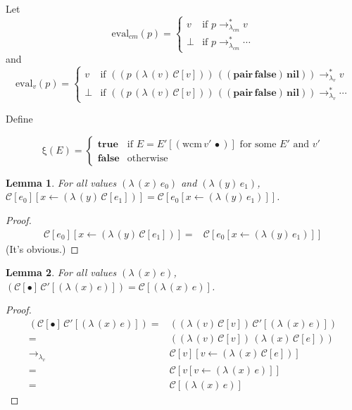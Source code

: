 \documentclass[ms,electronic,twosidetoc,letterpaper,chaptercenter,parttop]{byumsphd}
\newcommand{\false}{\mathbf{false}}
\newcommand{\nil}{\mathbf{nil}}
\newcommand{\pair}[2]{((\mathbf{pair}\,#1)\,#2)}
\newcommand{\lvrr}{\rightarrow_{\lambda_v}}
\newcommand{\lvrrs}{\rightarrow_{\lambda_v}^{*}}
\newcommand{\cmrrs}{\rightarrow_{\lambda_{cm}}^{*}}
\newcommand{\C}[1]{\mathcal{C}[#1]}
\newcommand{\Cp}[1]{\mathcal{C}'[#1]}
\newcommand{\abs}[2]{(\lambda\,(#1)\,#2)}
\newcommand{\app}[2]{(#1\,#2)}
\newcommand{\wcm}[2]{(\mathrm{wcm}\,#1\,#2)}
\newcommand{\hole}{\bullet}
\begin{document}
Let
\[
\mathrm{eval}_{cm}(p)=\begin{cases}
v     &\text{if $p\cmrrs v$}\\
\perp &\text{if $p\cmrrs\cdots$}
\end{cases}
\]
and
\[
\mathrm{eval}_{v}(p)=\begin{cases}
v     &\text{if $\app{\app{p}{\abs{v}{\C{v}}}}{\pair{\false}{\nil}}\lvrrs v$}\\
\perp &\text{if $\app{\app{p}{\abs{v}{\C{v}}}}{\pair{\false}{\nil}}\lvrrs\cdots$}
\end{cases}
\]

\newtheorem{lemma}{Lemma}
\newtheorem{theorem}{Theorem}
\newtheorem{case}{Case}

Define

\[
\mathrm{\xi}(E)=\begin{cases}
\mathbf{true} &\text{if $E=E'[\wcm{v'}{\hole}]$ for some $E'$ and $v'$}\\
\mathbf{false} &\text{otherwise}
\end{cases}
\]

\begin{lemma}
\label{collapse}
For all values $\abs{x}{e_0}$ and $\abs{y}{e_1}$, $\C{e_0}[x\leftarrow \abs{y}{\C{e_1}}]=\C{e_0[x\leftarrow \abs{y}{e_1}]}$.
\end{lemma}

\begin{proof}
\begin{align*}
\C{e_0}[x\leftarrow \abs{y}{\C{e_1}}] = &\C{e_0[x\leftarrow \abs{y}{e_1}}]
\end{align*}
(It's obvious.)
\end{proof}

\begin{lemma}
\label{hole-context-to-value}
For all values $\abs{x}{e}$, $\app{\C{\hole}}{\Cp{\abs{x}{e}}}=\C{\abs{x}{e}}$.
\end{lemma}

\begin{proof}
\begin{align*}
\app{\C{\hole}}{\Cp{\abs{x}{e}}} = &\app{\abs{v}{\C{v}}}{\Cp{\abs{x}{e}}}\\
                                 = &\app{\abs{v}{\C{v}}}{\abs{x}{\C{e}}}\\
                             \lvrr &\C{v}[v\leftarrow \abs{x}{\C{e}}]\\
                                 = &\C{v[v\leftarrow \abs{x}{e}]}\\
                                 = &\C{\abs{x}{e}}
\end{align*}
\end{proof}
\end{document}
